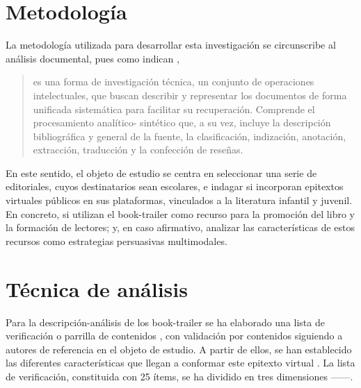 \documentclass[spanish]{textolivre}
\begin{document}
\section{Metodología}
La metodología utilizada para desarrollar esta investigación se circunscribe al análisis documental, pues como indican \textcite[p.2]{dulzaides2004analisis}, 
\begin{quote}
    es una forma de investigación técnica, un conjunto de operaciones intelectuales, que buscan describir y representar los documentos de forma unificada sistemática para facilitar su recuperación. Comprende el procesamiento analítico- sintético que, a su vez, incluye la descripción bibliográfica y general de la fuente, la clasificación, indización, anotación, extracción, traducción y la confección de reseñas.
\end{quote}
En este sentido, el objeto de estudio se centra en seleccionar una serie de editoriales, cuyos destinatarios sean escolares, e indagar si incorporan epitextos virtuales públicos en sus plataformas, vinculados a la literatura infantil y juvenil. En concreto, si utilizan el book-trailer como recurso para la promoción del libro y la formación de lectores; y, en caso afirmativo, analizar las características de estos recursos como estrategias persuasivas multimodales.

\section{Técnica de análisis}\label{sec-tecanalisis}
Para la descripción-análisis de los book-trailer se ha elaborado una lista de verificación o parrilla de contenidos \cite{lopez2002analisis}, con validación por contenidos siguiendo a autores de referencia en el objeto de estudio. A partir de ellos, se han establecido las diferentes características que llegan a conformar este epitexto virtual \cite{ibarra2016book,rosal2016ecfrasis,rovira2017booktrailer,tabernero_book_2013,tabernero2016epitextos}. La lista de verificación, constituida con 25 ítems, se ha dividido en tres dimensiones ——.
\end{document}

